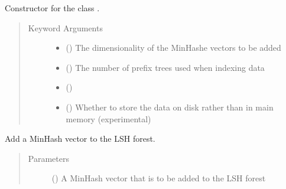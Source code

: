\documentclass[letterpaper,10pt,english]{sphinxmanual}
\begin{document}
\begin{fulllineitems}
\begin{fulllineitems}
\label{\detokenize{documentation:tmap.LSHForest.__init__}}
Constructor for the class {\hyperref[\detokenize{documentation:tmap.LSHForest}]{}}.
\begin{quote}\begin{description}
\item[{Keyword Arguments}] \leavevmode\begin{itemize}
\item {} 
 () \textendash{} The dimensionality of the MinHashe vectors to be added

\item {} 
 () \textendash{} The number of prefix trees used when indexing data

\item {} 
 () \textendash{} 

\item {} 
 () Whether to store the data on disk rather than in main memory (experimental) \textendash{} 

\end{itemize}

\end{description}\end{quote}

\end{fulllineitems}


\begin{fulllineitems}
\label{\detokenize{documentation:tmap.LSHForest.add}}
Add a MinHash vector to the LSH forest.
\begin{quote}\begin{description}
\item[{Parameters}] \leavevmode
{} () \textendash{} A MinHash vector that is to be added to the LSH forest


\end{description}
\end{quote}
\end{fulllineitems}
\end{fulllineitems}
\end{document}
